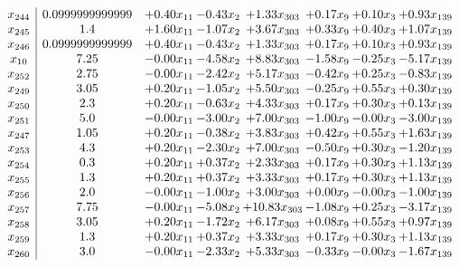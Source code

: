 \documentclass[8pt]{article}
\begin{document}
\[\begin{array}{c| c c@{\hskip 2pt} c@{\hskip 2pt} c@{\hskip 2pt} c@{\hskip 2pt} c@{\hskip 2pt} c@{\hskip 2pt} }
 x_{244}   &  0.0999999999999 & +  0.40 x_{11} & -0.43 x_{2} & +  1.33 x_{303} & +  0.17 x_{9} & +  0.10 x_{3} & +  0.93 x_{139}\\
 x_{245}   &  1.4 & +  1.60 x_{11} & -1.07 x_{2} & +  3.67 x_{303} & +  0.33 x_{9} & +  0.40 x_{3} & +  1.07 x_{139}\\
 x_{246}   &  0.0999999999999 & +  0.40 x_{11} & -0.43 x_{2} & +  1.33 x_{303} & +  0.17 x_{9} & +  0.10 x_{3} & +  0.93 x_{139}\\
 x_{10}   &  7.25 & -0.00 x_{11} & -4.58 x_{2} & +  8.83 x_{303} & -1.58 x_{9} & -0.25 x_{3} & -5.17 x_{139}\\
 x_{252}   &  2.75 & -0.00 x_{11} & -2.42 x_{2} & +  5.17 x_{303} & -0.42 x_{9} & +  0.25 x_{3} & -0.83 x_{139}\\
 x_{249}   &  3.05 & +  0.20 x_{11} & -1.05 x_{2} & +  5.50 x_{303} & -0.25 x_{9} & +  0.55 x_{3} & +  0.30 x_{139}\\
 x_{250}   &  2.3 & +  0.20 x_{11} & -0.63 x_{2} & +  4.33 x_{303} & +  0.17 x_{9} & +  0.30 x_{3} & +  0.13 x_{139}\\
 x_{251}   &  5.0 & -0.00 x_{11} & -3.00 x_{2} & +  7.00 x_{303} & -1.00 x_{9} & -0.00 x_{3} & -3.00 x_{139}\\
 x_{247}   &  1.05 & +  0.20 x_{11} & -0.38 x_{2} & +  3.83 x_{303} & +  0.42 x_{9} & +  0.55 x_{3} & +  1.63 x_{139}\\
 x_{253}   &  4.3 & +  0.20 x_{11} & -2.30 x_{2} & +  7.00 x_{303} & -0.50 x_{9} & +  0.30 x_{3} & -1.20 x_{139}\\
 x_{254}   &  0.3 & +  0.20 x_{11} & +  0.37 x_{2} & +  2.33 x_{303} & +  0.17 x_{9} & +  0.30 x_{3} & +  1.13 x_{139}\\
 x_{255}   &  1.3 & +  0.20 x_{11} & +  0.37 x_{2} & +  3.33 x_{303} & +  0.17 x_{9} & +  0.30 x_{3} & +  1.13 x_{139}\\
 x_{256}   &  2.0 & -0.00 x_{11} & -1.00 x_{2} & +  3.00 x_{303} & +  0.00 x_{9} & -0.00 x_{3} & -1.00 x_{139}\\
 x_{257}   &  7.75 & -0.00 x_{11} & -5.08 x_{2} & + 10.83 x_{303} & -1.08 x_{9} & +  0.25 x_{3} & -3.17 x_{139}\\
 x_{258}   &  3.05 & +  0.20 x_{11} & -1.72 x_{2} & +  6.17 x_{303} & +  0.08 x_{9} & +  0.55 x_{3} & +  0.97 x_{139}\\
 x_{259}   &  1.3 & +  0.20 x_{11} & +  0.37 x_{2} & +  3.33 x_{303} & +  0.17 x_{9} & +  0.30 x_{3} & +  1.13 x_{139}\\
 x_{260}   &  3.0 & -0.00 x_{11} & -2.33 x_{2} & +  5.33 x_{303} & -0.33 x_{9} & -0.00 x_{3} & -1.67 x_{139}\\

\end{array}\]
\end{document}
